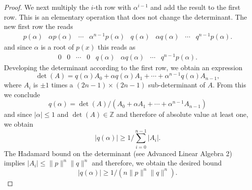 \begin{proof}
  We next multiply the $i$-th row with $α^{i-1}$ and add the result  to the first row. This is an elementary operation that does not change the determinant.  The new first row the reads
  \begin{displaymath}
    \begin{matrix}
          p(α)  & α p(α) & \cdots & α^{n-1} p(α) &  q(α)  & α q(α) & \cdots & q^{n-1} p(α). 
        \end{matrix}        
      \end{displaymath}
      and since $α$ is a root of $p(x)$ this reads as
       \begin{displaymath}
    \begin{matrix}
          0  & 0 & \cdots & 0 &  q(α)  & α q(α) & \cdots &q^{n-1} p(α). 
        \end{matrix}        
      \end{displaymath}
      Developing the determinant according to the first row, we obtain an expression
      \begin{equation}
        \label{eq:27}
        \det(A) = q(α) A_0 + αq(α) A_1 + \cdots + α^{n-1} q(α) A_{n-1}, 
      \end{equation}
      where $A_i$ is $\pm1$ times a $(2n-1) ×(2n-1)$ sub-determinant of $A$.
      From this we conclude
      \begin{equation}
        \label{eq:28}
        q(α) = \det(A) / (A_0 + α A_1 + \cdots + α^{n-1}  A_{n-1})
      \end{equation}
      and since $|α| ≤1$ and $\det(A) ∈ℤ$ and therefore of absolute value at least one, we obtain
      \begin{displaymath}
        |q(α)| ≥ 1 / ∑_{i=0}^{n-1} |A_i|. 
      \end{displaymath}
      The Hadamard bound on the determinant (see Advanced Linear Algebra 2) implies $|A_i| ≤ \|p\|^n \|q\|^n$ and therefore, we obtain the desired bound
       \begin{displaymath}
        |q(α)| ≥ 1 / (n \|p\|^n \|q\|^n) . 
      \end{displaymath}
\end{proof}

